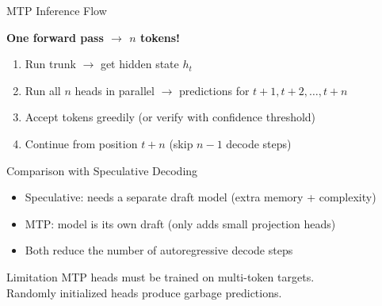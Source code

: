 \documentclass[aspectratio=169, 11pt]{beamer}
\begin{document}
\begin{frame}{MTP Inference Flow}

	\textbf{One forward pass $\rightarrow$ $n$ tokens!}

	\begin{enumerate}
		\item Run trunk $\rightarrow$ get hidden state $h_t$
		\item Run all $n$ heads in parallel $\rightarrow$ predictions for $t+1, t+2, \ldots, t+n$
		\item Accept tokens greedily (or verify with confidence threshold)
		\item Continue from position $t+n$ (skip $n-1$ decode steps)
	\end{enumerate}

	\begin{block}{Comparison with Speculative Decoding}
		\begin{itemize}
			\item Speculative: needs a separate draft model (extra memory + complexity)
			\item MTP: model is its own draft (only adds small projection heads)
			\item Both reduce the number of autoregressive decode steps
		\end{itemize}
	\end{block}

	\begin{alertblock}{Limitation}
		MTP heads must be trained on multi-token targets.\\
		Randomly initialized heads produce garbage predictions.
	\end{alertblock}

\end{frame}
\end{document}
